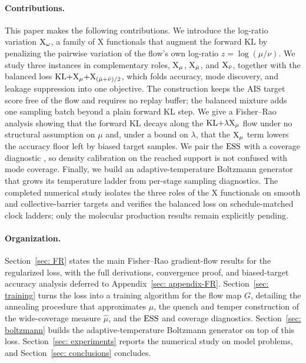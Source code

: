 \documentclass{article}
\begin{document}
\paragraph{Contributions.}
This paper makes the following contributions. We introduce the log-ratio variation $\mathrm{X}_\omega$, a family of X functionals that augment the forward KL by penalizing the pairwise variation of the flow's own log-ratio $z=\log(\mu/\nu)$. We study three instances in complementary roles, $\mathrm{X}_\mu$, $\mathrm{X}_{\hat\mu}$, and $\mathrm{X}_{\bar\nu}$, together with the balanced loss $\mathrm{KL}{+}\mathrm{X}_\mu{+}\mathrm{X}_{(\hat\mu+\bar\nu)/2}$, which folds accuracy, mode discovery, and leakage suppression into one objective. The construction keeps the AIS target score free of the flow and requires no replay buffer; the balanced mixture adds one sampling batch beyond a plain forward KL step. We give a Fisher--Rao analysis showing that the forward KL decays along the $\mathrm{KL}{+}\lambda\mathrm{X}_\mu$ flow under no structural assumption on $\mu$ and, under a bound on $\lambda$, that the $\mathrm{X}_\mu$ term lowers the accuracy floor left by biased target samples. We pair the $\mathrm{ESS}$ with a coverage diagnostic \citep{naeem2020reliable}, so density calibration on the reached support is not confused with mode coverage. Finally, we build an adaptive-temperature Boltzmann generator that grows its temperature ladder from per-stage sampling diagnostics. The completed numerical study isolates the three roles of the X functionals on smooth and collective-barrier targets and verifies the balanced loss on schedule-matched clock ladders; only the molecular production results remain explicitly pending.

\paragraph{Organization.}
Section~\ref{sec: FR} states the main Fisher--Rao gradient-flow results for the regularized loss, with the full derivations, convergence proof, and biased-target accuracy analysis deferred to Appendix~\ref{sec: appendix-FR}. Section~\ref{sec: training} turns the loss into a training algorithm for the flow map $G$, detailing the annealing procedure that approximates $\mu$, the quench and temper construction of the wide-coverage measure $\hat\mu$, and the $\mathrm{ESS}$ and coverage diagnostics. Section~\ref{sec: boltzmann} builds the adaptive-temperature Boltzmann generator on top of this loss. Section~\ref{sec: experiments} reports the numerical study on model problems, and Section~\ref{sec: conclusions} concludes.
\end{document}
